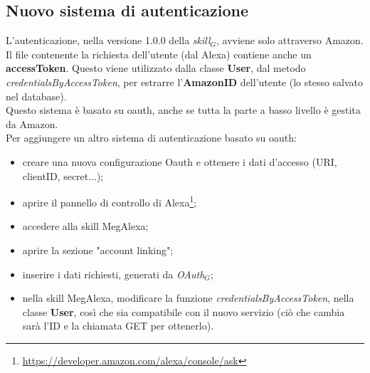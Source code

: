 \subsection{Nuovo sistema di autenticazione}\label{newAuth}
L'autenticazione, nella versione 1.0.0 della \textit{skill$_{G}$}, avviene solo attraverso Amazon.\\
Il file contenente la richiesta dell'utente (dal Alexa) contiene anche un \textbf{accessToken}. Questo viene utilizzato dalla classe \textbf{User}, dal metodo \textit{credentialsByAccessToken}, per estrarre l'\textbf{AmazonID} dell'utente (lo stesso salvato nel database).\\
Questo sistema è basato su oauth, anche se tutta la parte a basso livello è gestita da Amazon.\\
Per aggiungere un altro sistema di autenticazione basato su oauth:
\begin{itemize}
	\item creare una nuova configurazione Oauth e ottenere i dati d'accesso (URI, clientID, secret...);
	\item aprire il pannello di controllo di Alexa\footnote{\url{https://developer.amazon.com/alexa/console/ask}};
	\item accedere alla skill MegAlexa;
	\item aprire la sezione "account linking";
	\item inserire i dati richiesti, generati da \textit{OAuth$_{G}$};
	\item nella skill MegAlexa, modificare la funzione \textit{credentialsByAccessToken}, nella classe \textbf{User}, così che sia compatibile con il nuovo servizio (ciò che cambia sarà l'ID e la chiamata GET per ottenerlo).
\end{itemize}